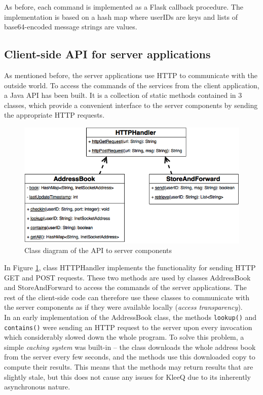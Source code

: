 \documentclass[a4paper, 12pt]{report}
\begin{document}
As before, each command is implemented as a Flask callback procedure. The implementation is based on a hash map where userIDs are keys and lists of base64-encoded message strings are values.


\subsection{Client-side API for server applications}
As mentioned before, the server applications use HTTP to communicate with the outside world. To access the commands of the services from the client application, a Java API has been built. It is a collection of static methods contained in 3 classes, which provide a convenient interface to the server components by sending the appropriate HTTP requests.

\begin{figure}[H]
    \centering
    \includegraphics[width = 0.8 \linewidth]{pics/scaffolding_uml.png}
    \caption{\label{fig:scaffolding_uml} Class diagram of the API to server components}
\end{figure}
In Figure \ref{fig:scaffolding_uml}, class HTTPHandler implements the functionality for sending HTTP GET and POST requests. These two methods are used by classes AddressBook and StoreAndForward to access the commands of the server applications. The rest of the client-side code can therefore use these classes to communicate with the server components as if they were available locally (\emph{access transparency}). \\

In an early implementation of the AddressBook class, the methods \texttt{lookup()} and \texttt{contains()} were sending an HTTP request to the server upon every invocation which considerably slowed down the whole program. To solve this problem, a simple \emph{caching system} was built-in -- the class downloads the whole address book from the server every few seconds, and the methods use this downloaded copy to compute their results. This means that the methods may return results that are slightly stale, but this does not cause any issues for KleeQ due to its inherently asynchronous nature. \\
\end{document}
